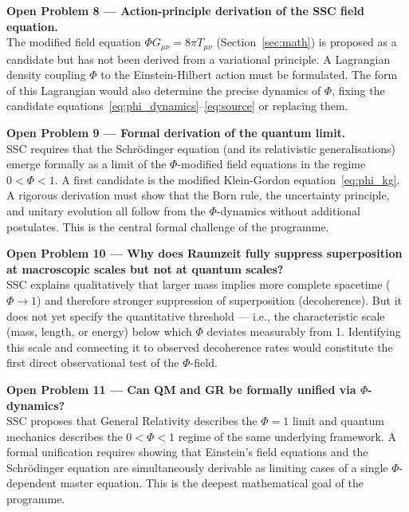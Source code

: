 \documentclass[12pt,a4paper]{article}
\begin{document}
\begin{openbox}
\textbf{Open Problem 8 — Action-principle derivation of the SSC field equation.}\\
The modified field equation $\Phi G_{\mu\nu} = 8\pi T_{\mu\nu}$
(Section~\ref{sec:math}) is proposed as a candidate but has not been
derived from a variational principle. A Lagrangian density coupling
$\Phi$ to the Einstein-Hilbert action must be formulated. The form of
this Lagrangian would also determine the precise dynamics of $\Phi$,
fixing the candidate equations~\eqref{eq:phi_dynamics}--\eqref{eq:source}
or replacing them.
\end{openbox}

\begin{openbox}
\textbf{Open Problem 9 — Formal derivation of the quantum limit.}\\
SSC requires that the Schrödinger equation (and its relativistic
generalisations) emerge formally as a limit of the $\Phi$-modified
field equations in the regime $0 < \Phi < 1$. A first candidate is
the modified Klein-Gordon equation~\eqref{eq:phi_kg}. A rigorous
derivation must show that the Born rule, the uncertainty principle,
and unitary evolution all follow from the $\Phi$-dynamics without
additional postulates. This is the central formal challenge of the
programme.
\end{openbox}

\begin{openbox}
\textbf{Open Problem 10 — Why does Raumzeit fully suppress superposition at macroscopic scales but not at quantum scales?}\\
SSC explains qualitatively that larger mass implies more complete
spacetime ($\Phi \to 1$) and therefore stronger suppression of
superposition (decoherence). But it does not yet specify the
quantitative threshold — i.e., the characteristic scale (mass, length,
or energy) below which $\Phi$ deviates measurably from 1. Identifying
this scale and connecting it to observed decoherence rates would
constitute the first direct observational test of the $\Phi$-field.
\end{openbox}

\begin{openbox}
\textbf{Open Problem 11 — Can QM and GR be formally unified via $\Phi$-dynamics?}\\
SSC proposes that General Relativity describes the $\Phi = 1$ limit and
quantum mechanics describes the $0 < \Phi < 1$ regime of the same
underlying framework. A formal unification requires showing that
Einstein's field equations and the Schrödinger equation are
simultaneously derivable as limiting cases of a single $\Phi$-dependent
master equation. This is the deepest mathematical goal of the
programme.
\end{openbox}
\end{document}
